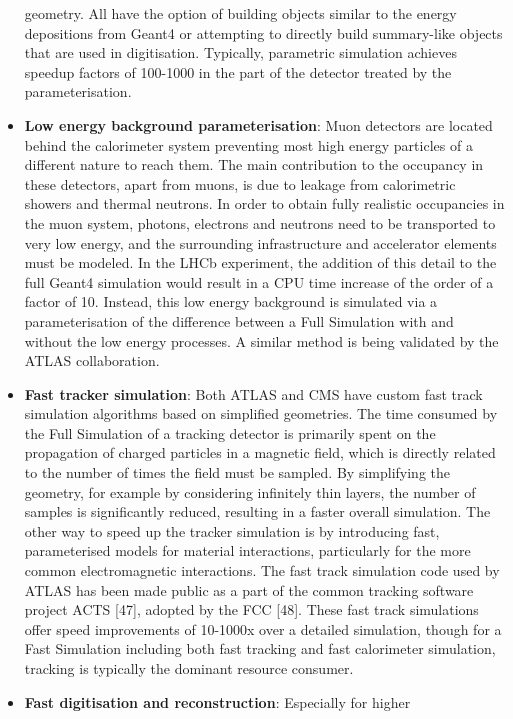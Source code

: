 \documentclass[12pt,a4paper]{article}
\begin{document}
\begin{itemize}
  geometry. All have the option of building objects similar to the
  energy depositions from Geant4 or attempting to directly build
  summary-like objects that are used in digitisation. Typically,
  parametric simulation achieves speedup factors of 100-1000 in the part
  of the detector treated by the parameterisation.
\item
  \textbf{Low energy background parameterisation}: Muon detectors are
  located behind the calorimeter system preventing most high energy
  particles of a different nature to reach them. The main contribution
  to the occupancy in these detectors, apart from muons, is due to
  leakage from calorimetric showers and thermal neutrons. In order to
  obtain fully realistic occupancies in the muon system, photons,
  electrons and neutrons need to be transported to very low energy, and
  the surrounding infrastructure and accelerator elements must be
  modeled. In the LHCb experiment, the addition of this detail to the
  full Geant4 simulation would result in a CPU time increase of the
  order of a factor of 10. Instead, this low energy background is
  simulated via a parameterisation of the difference between a Full
  Simulation with and without the low energy processes. A similar method
  is being validated by the ATLAS collaboration.
\item
  \textbf{Fast tracker simulation}: Both ATLAS and CMS have custom fast
  track simulation algorithms based on simplified geometries. The time
  consumed by the Full Simulation of a tracking detector is primarily
  spent on the propagation of charged particles in a magnetic field,
  which is directly related to the number of times the field must be
  sampled. By simplifying the geometry, for example by considering
  infinitely thin layers, the number of samples is significantly
  reduced, resulting in a faster overall simulation. The other way to
  speed up the tracker simulation is by introducing fast, parameterised
  models for material interactions, particularly for the more common
  electromagnetic interactions. The fast track simulation code used by
  ATLAS has been made public as a part of the common tracking software
  project ACTS {[}47{]}, adopted by the FCC {[}48{]}. These fast track
  simulations offer speed improvements of 10-1000x over a detailed
  simulation, though for a Fast Simulation including both fast tracking
  and fast calorimeter simulation, tracking is typically the dominant
  resource consumer.
\item
  \textbf{Fast digitisation and reconstruction}: Especially for higher

\end{itemize}
\end{document}
